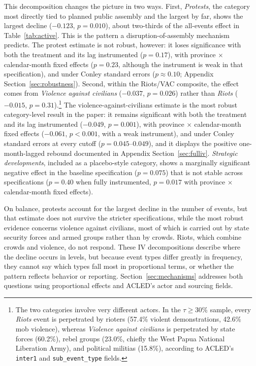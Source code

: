 \documentclass[12pt]{article}
\begin{document}
This decomposition changes the picture in two ways. First, \emph{Protests}, the category most directly tied to planned public assembly and the largest by far, shows the largest decline ($-0.123$, $p=0.010$), about two-thirds of the all-events effect in Table~\ref{tab:active}. This is the pattern a disruption-of-assembly mechanism predicts. The protest estimate is not robust, however: it loses significance with both the treatment and its lag instrumented ($p=0.17$), with province $\times$ calendar-month fixed effects ($p=0.23$, although the instrument is weak in that specification), and under Conley standard errors ($p \approx 0.10$; Appendix Section~\ref{sec:robustness}). Second, within the Riots/VAC composite, the effect comes from \emph{Violence against civilians} ($-0.037$, $p=0.026$) rather than \emph{Riots} ($-0.015$, $p=0.31$).\footnote{The two categories involve very different actors. In the $\tau \geq 30\%$ sample, every \emph{Riots} event is perpetrated by rioters (57.4\% violent demonstrations, 42.6\% mob violence), whereas \emph{Violence against civilians} is perpetrated by state forces (60.2\%), rebel groups (23.0\%, chiefly the West Papua National Liberation Army), and political militias (15.8\%), according to ACLED's \texttt{inter1} and \texttt{sub\_event\_type} fields.} The violence-against-civilians estimate is the most robust category-level result in the paper: it remains significant with both the treatment and its lag instrumented ($-0.049$, $p=0.001$), with province $\times$ calendar-month fixed effects ($-0.061$, $p<0.001$, with a weak instrument), and under Conley standard errors at every cutoff ($p=0.045$--$0.049$), and it displays the positive one-month-lagged rebound documented in Appendix Section~\ref{sec:fulliv}. \emph{Strategic developments}, included as a placebo-style category, shows a marginally significant negative effect in the baseline specification ($p=0.075$) that is not stable across specifications ($p=0.40$ when fully instrumented, $p=0.017$ with province $\times$ calendar-month fixed effects).

On balance, protests account for the largest decline in the number of events, but that estimate does not survive the stricter specifications, while the most robust evidence concerns violence against civilians, most of which is carried out by state security forces and armed groups rather than by crowds. Riots, which combine crowds and violence, do not respond. These IV decompositions describe where the decline occurs in levels, but because event types differ greatly in frequency, they cannot say which types fall most in proportional terms, or whether the pattern reflects behavior or reporting. Section~\ref{sec:mechanisms} addresses both questions using proportional effects and ACLED's actor and sourcing fields.
\end{document}
